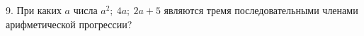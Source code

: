 9. При каких $a$ числа $a^2;\ 4a;\ 2a+5$ являются тремя последовательными членами арифметической прогрессии?\\
